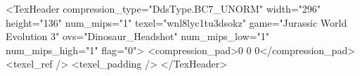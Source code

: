 <TexHeader compression_type="DdsType.BC7_UNORM" width="296" height="136" num_mips="1" texel="wnl8lyc1tu3dsokz" game="Jurassic World Evolution 3" ovs="Dinosaur_Headshot" num_mips_low="1" num_mips_high="1" flag="0">
	<compression_pad>0 0 0</compression_pad>
	<texel_ref />
	<texel_padding />
</TexHeader>
